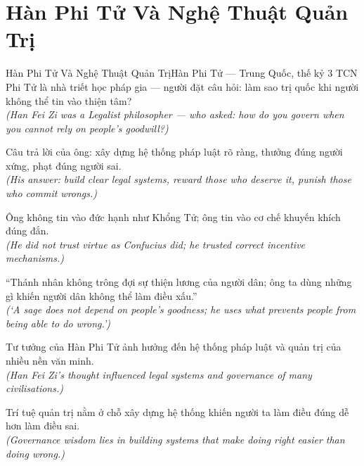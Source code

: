 \section{Hàn Phi Tử Và Nghệ Thuật Quản Trị}
\begin{truyen}{Hàn Phi Tử Và Nghệ Thuật Quản Trị}{Hàn Phi Tử --- Trung Quốc, thế kỷ 3 TCN}
 Phi Tử là nhà triết học pháp gia --- người đặt câu hỏi: làm sao trị quốc khi người không thể tin vào thiện tâm?\\[4pt]
\textit{(Han Fei Zi was a Legalist philosopher --- who asked: how do you govern when you cannot rely on people's goodwill?)}

Câu trả lời của ông: xây dựng hệ thống pháp luật rõ ràng, thưởng đúng người xứng, phạt đúng người sai.\\[4pt]
\textit{(His answer: build clear legal systems, reward those who deserve it, punish those who commit wrongs.)}

Ông không tin vào đức hạnh như Khổng Tử; ông tin vào cơ chế khuyến khích đúng đắn.\\[4pt]
\textit{(He did not trust virtue as Confucius did; he trusted correct incentive mechanisms.)}

``Thánh nhân không trông đợi sự thiện lương của người dân; ông ta dùng những gì khiến người dân không thể làm điều xấu.''\\[4pt]
\textit{(`A sage does not depend on people's goodness; he uses what prevents people from being able to do wrong.')}

Tư tưởng của Hàn Phi Tử ảnh hưởng đến hệ thống pháp luật và quản trị của nhiều nền văn minh.\\[4pt]
\textit{(Han Fei Zi's thought influenced legal systems and governance of many civilisations.)}

\end{truyen}
\begin{baihoc}
  Trí tuệ quản trị nằm ở chỗ xây dựng hệ thống khiến người ta làm điều đúng dễ hơn làm điều sai.\\[4pt]
  \textit{(Governance wisdom lies in building systems that make doing right easier than doing wrong.)}
\end{baihoc}


